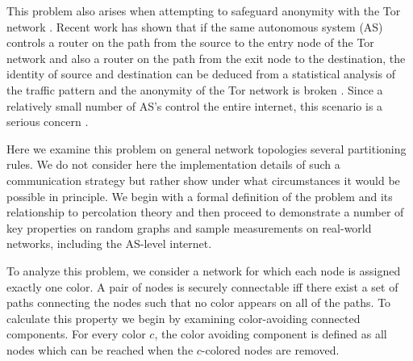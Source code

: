 \documentclass[aps, prl, twocolumn, a4paper, floatfix]{revtex4}
\begin{document}
This problem also arises when attempting to safeguard anonymity with the Tor network \cite{dingledine-proceedings2004}.  
Recent work has shown that if the same autonomous system (AS) controls a router on the path from the source to the entry node of the Tor network and also a router on the path from the exit node to the destination, the identity of source and destination can be deduced from a statistical analysis of the traffic pattern and the anonymity of the Tor network is broken \cite{murdoch-proceedings2007}.
Since a relatively small number of AS's control the entire internet, this scenario is a serious concern \cite{edman-proceedings2009}.

Here we examine this problem on general network topologies several partitioning rules.  
We do not consider here the implementation details of such a communication strategy but rather show under what circumstances it would be possible in principle.
We begin with a formal definition of the problem and its relationship to percolation theory and then proceed to demonstrate a number of key properties on random graphs and sample measurements on real-world networks, including the AS-level internet.

To analyze this problem, we consider a network for which each node is assigned exactly one color.
A pair of nodes is securely connectable iff there exist a set of paths connecting the nodes such that no color appears on all of the paths.  
To calculate this property we begin by examining color-avoiding connected components.
For every color $c$, the color avoiding component is defined as all nodes which can be reached when the $c$-colored nodes are removed.



\end{document}
